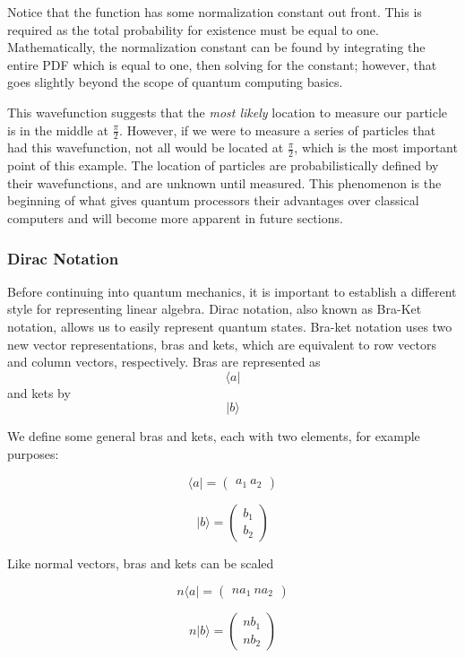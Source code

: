 \documentclass[11pt]{article}
\begin{document}
    Notice that the function has some normalization constant out front. This
is required as the total probability for existence must be equal to one.
Mathematically, the normalization constant can be found by integrating
the entire PDF which is equal to one, then solving for the constant;
however, that goes slightly beyond the scope of quantum computing
basics.

This wavefunction suggests that the \emph{most likely} location to
measure our particle is in the middle at \(\frac{\pi}{2}\). However, if
we were to measure a series of particles that had this wavefunction, not
all would be located at \(\frac{\pi}{2}\), which is the most important
point of this example. The location of particles are probabilistically
defined by their wavefunctions, and are unknown until measured. This
phenomenon is the beginning of what gives quantum processors their
advantages over classical computers and will become more apparent in
future sections.

    \subsubsection{Dirac Notation}\label{dirac-notation}

    Before continuing into quantum mechanics, it is important to establish a
different style for representing linear algebra. Dirac notation, also
known as Bra-Ket notation, allows us to easily represent quantum states.
Bra-ket notation uses two new vector representations, bras and kets,
which are equivalent to row vectors and column vectors, respectively.
Bras are represented as \[\langle a |\] and kets by \[| b \rangle\]

We define some general bras and kets, each with two elements, for
example purposes:

\[\langle a | = \begin{pmatrix} a_1 \ a_2 \end{pmatrix}\]

\[| b \rangle = \begin{pmatrix} b_1 \\ b_2 \end{pmatrix}\]

Like normal vectors, bras and kets can be scaled

\[n\langle a | = \begin{pmatrix} na_1 \ na_2 \end{pmatrix}\]

\[n| b \rangle = \begin{pmatrix} nb_1 \\ nb_2 \end{pmatrix}\]
\end{document}
